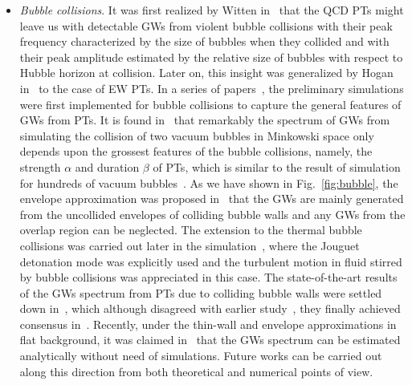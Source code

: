 \documentclass[a4paper,11pt]{article}
\begin{document}
\begin{itemize}
  \item \textit{Bubble collisions}. It was first realized by Witten in~\cite{Witten:1984rs} that the QCD PTs might leave us with detectable GWs from violent bubble collisions with their peak frequency characterized by the size of bubbles when they collided and with their peak amplitude estimated by the relative size of bubbles with respect to Hubble horizon at collision. Later on, this insight was generalized by Hogan in~\cite{Hogan:1986qda} to the case of EW PTs. In a series of  papers~\cite{Kosowsky:1991ua,Kosowsky:1992rz,Kosowsky:1992vn,Kamionkowski:1993fg}, the preliminary simulations were first implemented for bubble collisions to capture the general features of GWs from PTs. It is found in~\cite{Kosowsky:1991ua,Kosowsky:1992rz} that remarkably the spectrum of GWs from simulating the collision of two vacuum bubbles in Minkowski space only depends upon the grossest features of the bubble collisions, namely, the strength $\alpha$ and duration $\beta$ of PTs, which is similar to the result of simulation for hundreds of vacuum bubbles~\cite{Kosowsky:1992vn}. As we have shown in Fig.~\ref{fig:bubble}, the envelope approximation was proposed in~\cite{Kosowsky:1991ua,Kosowsky:1992rz,Kosowsky:1992vn} that the GWs are mainly generated from the uncollided envelopes of colliding bubble walls and any GWs from the overlap region can be neglected. The extension to the thermal bubble collisions was carried out later in the simulation~\cite{Kamionkowski:1993fg}, where the Jouguet detonation mode was explicitly used and the turbulent motion in fluid stirred by bubble collisions was appreciated in this case. The state-of-the-art results of the GWs spectrum from PTs due to colliding bubble walls were settled down in~\cite{Huber:2008hg}, which although disagreed with earlier study~\cite{Caprini:2007xq}, they finally achieved consensus in~\cite{Caprini:2009fx}. Recently, under the thin-wall and envelope approximations in flat background, it was claimed in~\cite{Jinno:2016vai} that the GWs spectrum can be estimated analytically without need of  simulations. Future works can be carried out along this direction from both theoretical and numerical points of view.

\end{itemize}
\end{document}

